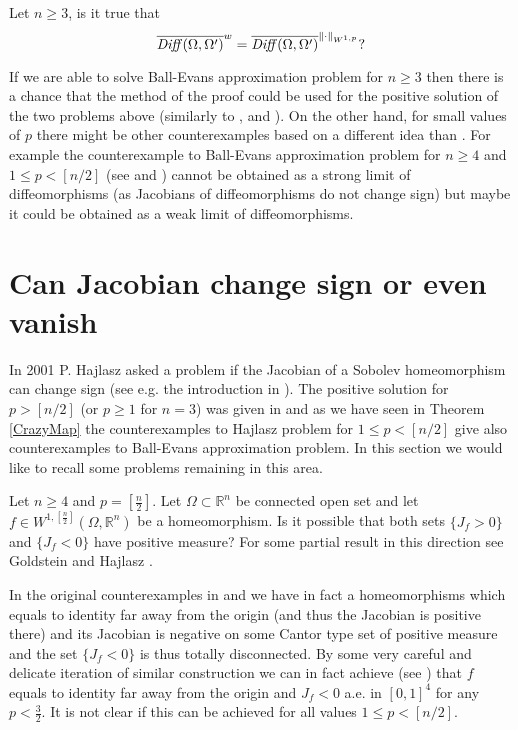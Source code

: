\documentclass[12pt,a4paper]{amsart}
\theoremstyle{plain}
\theoremstyle{definition}
\numberwithin{equation}{section}
\def\Dif{{\it{Diff}}}
\def\rn{\mathbb R^n}
\newcounter{problem}
\begin{document}
\vskip 10pt

Let $n\geq 3$, is it true that 
$$
\overline{\Dif(\Omega,\Omega')}^{w}=\overline{\Dif(\Omega,\Omega')}^{\|\cdot\|_{W^{1,p}}}?
$$

If we are able to solve Ball-Evans approximation problem for $n\geq 3$ then there is a chance that the method of the proof could be used for the positive solution of the two problems above (similarly to \cite{IO}, \cite{IO2} and \cite{DPP}). On the other hand, for small values of $p$ there might be other counterexamples based on a different idea than \cite{DHM}. For example the counterexample to Ball-Evans approximation problem for $n\geq 4$ and $1\leq p<[n/2]$ (see \cite{HV} and \cite{CHT}) cannot be obtained as a strong limit of diffeomorphisms (as Jacobians of diffeomorphisms do not change sign) but maybe it could be obtained as a weak limit of diffeomorphisms. 


\vskip 10pt

\section{Can Jacobian change sign or even vanish}

In 2001 P. Hajlasz asked a problem if the Jacobian of a Sobolev homeomorphism can change sign (see e.g. the introduction in \cite{GH}). The positive solution for $p>[n/2]$ (or $p\geq 1$ for $n=3$) was given in \cite{HM} and  
as we have seen in Theorem \ref{CrazyMap} the counterexamples to Hajlasz problem for $1\leq p<[n/2]$ give also counterexamples to Ball-Evans approximation problem. In this section we would like to recall some problems remaining in this area. 

\vskip 10pt

 Let $n\geq 4$ and $p=[\frac{n}{2}]$. Let $\Omega\subset\rn$ be connected open set and let $f\in W^{1,[\frac{n}{2}]}(\Omega,\rn)$ be a homeomorphism. Is it possible that both sets $\{J_f>0\}$ and $\{J_f<0\}$ have positive measure? For some partial result in this direction see Goldstein and Hajlasz \cite{GH1}. 

\vskip 10pt

In the original counterexamples in \cite{HV} and \cite{CHT} we have in fact a homeomorphisms which equals to identity far away from the origin (and thus the Jacobian is positive there) and its Jacobian is negative on some Cantor type set of positive measure and the set $\{J_f<0\}$ is thus totally disconnected. 
By some very careful and delicate iteration of similar construction we can in fact achieve (see \cite{CDH}) that $f$ equals to identity far away from the origin and $J_f<0$ a.e. in $[0,1]^4$ for any $p<\frac{3}{2}$. It is not clear if this can be achieved for all values $1\leq p<[n/2]$. 
\end{document}
